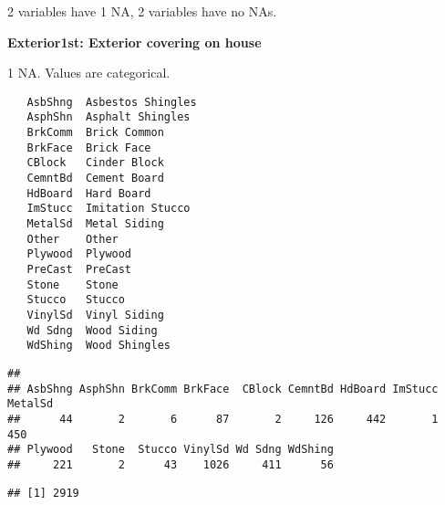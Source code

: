 \documentclass[]{article}
\newenvironment{Shaded}{\begin{snugshade}}{\end{snugshade}}
\newcommand{\KeywordTok}[1]{\textcolor[rgb]{0.13,0.29,0.53}{\textbf{#1}}}
\newcommand{\DecValTok}[1]{\textcolor[rgb]{0.00,0.00,0.81}{#1}}
\newcommand{\StringTok}[1]{\textcolor[rgb]{0.31,0.60,0.02}{#1}}
\newcommand{\CommentTok}[1]{\textcolor[rgb]{0.56,0.35,0.01}{\textit{#1}}}
\newcommand{\OperatorTok}[1]{\textcolor[rgb]{0.81,0.36,0.00}{\textbf{#1}}}
\newcommand{\NormalTok}[1]{#1}
\begin{document}
2 variables have 1 NA, 2 variables have no NAs.

\textbf{Exterior1st: Exterior covering on house}

1 NA. Values are categorical.

\begin{verbatim}
   AsbShng  Asbestos Shingles
   AsphShn  Asphalt Shingles
   BrkComm  Brick Common
   BrkFace  Brick Face
   CBlock   Cinder Block
   CemntBd  Cement Board
   HdBoard  Hard Board
   ImStucc  Imitation Stucco
   MetalSd  Metal Siding
   Other    Other
   Plywood  Plywood
   PreCast  PreCast 
   Stone    Stone
   Stucco   Stucco
   VinylSd  Vinyl Siding
   Wd Sdng  Wood Siding
   WdShing  Wood Shingles
\end{verbatim}

\begin{Shaded}
\end{Shaded}

\begin{verbatim}
## 
## AsbShng AsphShn BrkComm BrkFace  CBlock CemntBd HdBoard ImStucc MetalSd 
##      44       2       6      87       2     126     442       1     450 
## Plywood   Stone  Stucco VinylSd Wd Sdng WdShing 
##     221       2      43    1026     411      56
\end{verbatim}

\begin{Shaded}
\end{Shaded}

\begin{verbatim}
## [1] 2919
\end{verbatim}
\end{document}
